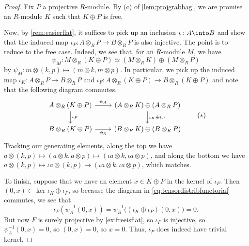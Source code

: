 \begin{proof}
	Fix $P$ a projective $R$-module. By (c) of \autoref{lem:projgrabbag}, we are promise an $R$-module $K$ such that $K\oplus P$ is free.

	Now, by \autoref{rem:easierflat}, it suffices to pick up an inclusion $\iota:A\into B$ and show that the induced map $\iota_P:A\otimes_RP\to B\otimes_RP$ is also injective. The point is to reduce to the free case. Indeed, we see that, for an $R$-module $M$, we have
	\[\psi_M:M\otimes_R(K\oplus P)\simeq(M\otimes_RK)\oplus(M\otimes_RP)\]
	by $\psi_M:m\otimes(k,p)\mapsto(m\otimes k,m\otimes p)$. In particular, we pick up the induced map $\iota_K:A\otimes_RP\to B\otimes_RP$ and $\iota_F:A\otimes_R(K\oplus P)\to B\otimes_R(K\oplus P)$ and note that the following diagram commutes.
	\[\begin{tikzcd}
		{A\otimes_R(K\oplus P)} & {(A\otimes_RK)\oplus(A\otimes_RP)} \\
		{B\otimes_R(K\oplus P)} & {(B\otimes_RK)\oplus(B\otimes_RP)}
		\arrow["{\iota_F}", from=1-1, to=2-1]
		\arrow["{\iota_K\oplus\iota_P}", from=1-2, to=2-2]
		\arrow["{\psi_A}", from=1-1, to=1-2]
		\arrow["{\psi_B}"', from=2-1, to=2-2]
	\end{tikzcd}\tag{$*$}\label{eq:tensordistribfunctorial}\]
	Tracking our generating elements, along the top we have $a\otimes(k,p)\mapsto(a\otimes k,a\otimes p)\mapsto(\iota a\otimes k,\iota a\otimes p)$, and along the bottom we have $a\otimes(k,p)\mapsto\iota a\otimes(k,p)\mapsto(\iota a\otimes k,\iota a\otimes p)$, which matches.

	To finish, suppose that we have an element $x\in K\oplus P$ in the kernel of $\iota_P$. Then $(0,x)\in\ker\iota_K\oplus\iota_P$, so because the diagram in \autoref{eq:tensordistribfunctorial} commutes, we see that
	\[\iota_F\left(\psi_A^{-1}(0,x)\right)=\psi_B^{-1}\big((\iota_K\oplus\iota_P)(0,x)\big)=0.\]
	But now $F$ is surely projective by \autoref{ex:freeisflat}, so $\iota_F$ is injective, so $\psi_A^{-1}(0,x)=0$, so $(0,x)=0$, so $x=0$. Thus, $\iota_P$ does indeed have trivial kernel.
\end{proof}

